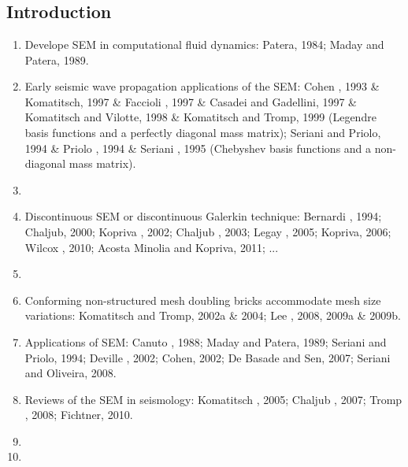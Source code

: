\renewcommand{\pmk}{Peter\_2011\_GJI\_Adjoint on hexahedral meshes}
\renewcommand{\prf}{FWI/\pmk.pdf}
\renewcommand{\pti}{Forward and adjoint simulations of seismic wave propagation
on fully unstructured hexahedral meshes}
\renewcommand{\pay}{Daniel Peter, Dimitri Komatitsch, Yang Luo, \etal, 2011}
\renewcommand{\pjo}{Geophys. J. Int.}
\renewcommand{\pda}{2017/4/14 Fri.}

\section{\pinfo}
\subsection{Introduction}
\begin{enumerate}[\hspace{10mm}*]
  \item Develope SEM in computational fluid dynamics: Patera, 1984; Maday and Patera, 1989.
  \item Early seismic wave propagation applications of the SEM:
    Cohen \etal, 1993 \& Komatitsch, 1997 \& Faccioli \etal, 1997 \& Casadei and Gadellini, 1997
    \& Komatitsch and Vilotte, 1998 \& Komatitsch and Tromp, 1999
    (Legendre basis functions and a perfectly diagonal mass matrix);
    Seriani and Priolo, 1994 \& Priolo \etal, 1994 \& Seriani \etal, 1995
    (Chebyshev basis functions and a non-diagonal mass matrix).
  \item \sline
  \item Discontinuous SEM or discontinuous Galerkin technique: Bernardi \etal, 1994; Chaljub, 2000;
    Kopriva \etal, 2002; Chaljub \etal, 2003; Legay \etal, 2005; Kopriva, 2006;
    Wilcox \etal, 2010; Acosta Minolia and Kopriva, 2011; ...
  \item \sline
  \item Conforming non-structured mesh doubling bricks accommodate mesh size variations:
    Komatitsch and Tromp, 2002a \& 2004; Lee \etal, 2008, 2009a \& 2009b.
  \item Applications of SEM: Canuto \etal, 1988; Maday and Patera, 1989; Seriani and Priolo, 1994;
    Deville \etal, 2002; Cohen, 2002; De Basade and Sen, 2007; Seriani and Oliveira, 2008.
  \item Reviews of the SEM in seismology: Komatitsch \etal, 2005; Chaljub \etal, 2007;
    Tromp \etal, 2008; Fichtner, 2010.
  \item \sline
  \item
\end{enumerate}

